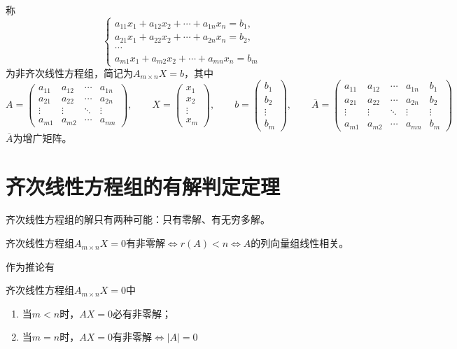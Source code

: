 称
\[
    \begin{cases}
        a_{11}x_1 + a_{12}x_2 + \cdots + a_{1n}x_n = b_1, \\
        a_{21}x_1 + a_{22}x_2 + \cdots + a_{2n}x_n = b_2, \\
        \cdots                                            \\
        a_{m1}x_1 + a_{m2}x_2 + \cdots + a_{mn}x_n = b_m
    \end{cases}
\]
为非齐次线性方程组，简记为$A_{m\times n}X=b$，其中
\[
    A =
    \begin{pmatrix}
        a_{11} & a_{12} & \cdots & a_{1n} \\
        a_{21} & a_{22} & \cdots & a_{2n} \\
        \vdots & \vdots & \ddots & \vdots \\
        a_{m1} & a_{m2} & \cdots & a_{mn}
    \end{pmatrix},
    \qquad
    X=
    \begin{pmatrix}
        x_1 \\x_2\\\vdots\\x_m
    \end{pmatrix},
    \qquad
    b=
    \begin{pmatrix}
        b_1 \\b_2\\\vdots\\b_m
    \end{pmatrix},
    \qquad
    \overline{A}=
    \left(\begin{array}{cccc|c}
            a_{11} & a_{12} & \cdots & a_{1n} & b_1    \\
            a_{21} & a_{22} & \cdots & a_{2n} & b_2    \\
            \vdots & \vdots & \ddots & \vdots & \vdots \\
            a_{m1} & a_{m2} & \cdots & a_{mn} & b_m
        \end{array}\right)
\]
$\overline{A}$为增广矩阵。

\section{齐次线性方程组的有解判定定理}
齐次线性方程组的解只有两种可能：只有零解、有无穷多解。
\begin{theorem}
    齐次线性方程组$A_{m\times n}X=0$有非零解$\iff r(A)<n \iff A$的列向量组线性相关。
\end{theorem}
作为推论有
\begin{theorem}
    齐次线性方程组$A_{m\times n}X=0$中
    \begin{enumerate}[(1)]
        \item 当$m<n$时，$AX=0$必有非零解；
        \item 当$m=n$时，$AX=0$有非零解$\iff |A|=0$
    \end{enumerate}
\end{theorem}

